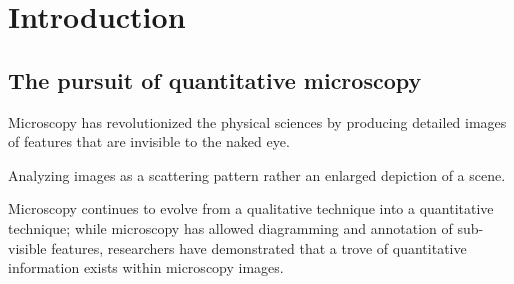 \chapter{Introduction}
\label{ch:intro}






\section{The pursuit of quantitative microscopy}

Microscopy has revolutionized the physical sciences by producing
detailed images of features that are invisible to the naked eye.


Analyzing images as a scattering pattern rather an enlarged
depiction of a scene.

Microscopy continues to evolve from a qualitative technique into a
quantitative technique; while microscopy has allowed diagramming
and annotation of sub-visible features, researchers have demonstrated
that a trove of quantitative information exists within microscopy images.




